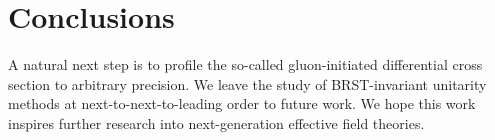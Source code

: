 \section{Conclusions}\label{sec:conclusions}

A natural next step is to profile the so-called gluon-initiated
differential cross section to arbitrary precision. We leave the study of
BRST-invariant unitarity methods at next-to-next-to-leading order to
future work. We hope this work inspires further research into
next-generation effective field theories.

